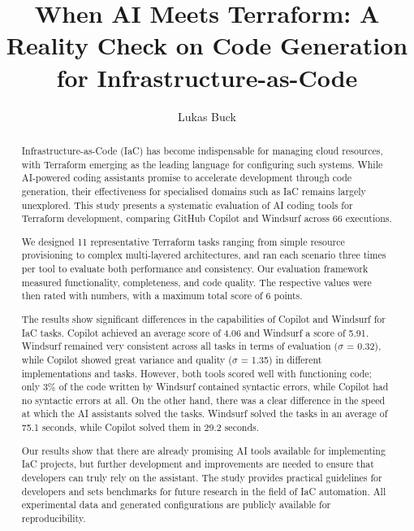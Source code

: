 \documentclass[sigconf]{acmart}
\begin{document}
\title{When AI Meets Terraform: A Reality Check on Code Generation for Infrastructure-as-Code}

\author{Lukas Buck}

\begin{abstract}
Infrastructure-as-Code (IaC) has become indispensable for managing cloud resources, with Terraform emerging as the leading language for configuring such systems. While AI-powered coding assistants promise to accelerate development through code generation, their effectiveness for specialised domains such as IaC remains largely unexplored. This study presents a systematic evaluation of AI coding tools for Terraform development, comparing GitHub Copilot and Windsurf across 66 executions.


We designed 11 representative Terraform tasks ranging from simple resource provisioning to complex multi-layered architectures, and ran each scenario three times per tool to evaluate both performance and consistency. Our evaluation framework measured functionality, completeness, and code quality. The respective values were then rated with numbers, with a maximum total score of 6 points.

The results show significant differences in the capabilities of Copilot and Windsurf for IaC tasks. Copilot achieved an average score of 4.06 and Windsurf a score of 5.91. Windsurf remained very consistent across all tasks in terms of evaluation ($\sigma$ = 0.32), while Copilot showed great variance and quality ($\sigma$ = 1.35) in different implementations and tasks. However, both tools scored well with functioning code; only 3\% of the code written by Windsurf contained syntactic errors, while Copilot had no syntactic errors at all. On the other hand, there was a clear difference in the speed at which the AI assistants solved the tasks. Windsurf solved the tasks in an average of 75.1 seconds, while Copilot solved them in 29.2 seconds.

Our results show that there are already promising AI tools available for implementing IaC projects, but further development and improvements are needed to ensure that developers can truly rely on the assistant. The study provides practical guidelines for developers and sets benchmarks for future research in the field of IaC automation. All experimental data and generated configurations are publicly available for reproducibility.

\end{abstract}
\end{document}
